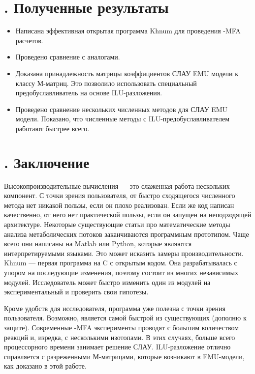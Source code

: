 \documentclass[14pt, a4paper]{extreport}
\newcommand{\CC}{C\nolinebreak\hspace{-.05em}\raisebox{.4ex}{\tiny\bf +}\nolinebreak\hspace{-.10em}\raisebox{.4ex}{\tiny\bf +}}
\def\CC{{C\nolinebreak[4]\hspace{-.05em}\raisebox{.4ex}{\tiny\bf ++}}} %
\begin{document}
\chapter[Полученные результаты]{\thechapter{}. Полученные результаты}
\begin{itemize}
	\item Написана эффективная открытая программа Khnum для проведения -MFA расчетов.
	\item Проведено сравнение с аналогами.
	\item Доказана принадлежность матрицы коэффициентов СЛАУ EMU модели к классу М-матриц. Это позволило использовать специальный предобуславливатель на основе ILU-разложения.
	\item Проведено сравнение нескольких численных методов для СЛАУ EMU модели. Показано, что численные методы с ILU-предобуславливателем работают быстрее всего.
\end{itemize}


\chapter[Заключение]{\thechapter{}. Заключение}
Высокопроизводительные вычисления --- это слаженная работа нескольких компонент. С точки зрения пользователя, от быстро сходящегося численного метода нет никакой пользы, если он плохо реализован. Если же код написан качественно, от него нет практической пользы, если он запущен на неподходящей архитектуре. Некоторые существующие статьи про математические методы анализа метаболических потоков заканчиваются программным прототипом\cite{adjoint_approach, bayesian_3, p13CMFA}. Чаще всего они написаны на Matlab или Python, которые являются интерпретируемыми языками. Это может исказить замеры производительности. Khnum --- первая программа на \CC{} с открытым кодом. Она разрабатывалась с упором на последующие изменения, поэтому состоит из многих независимых модулей. Исследователь может быстро изменить один из модулей на экспериментальный и проверить свои гипотезы. 

Кроме удобств для исследователя, программа уже полезна с точки зрения пользователя. Возможно, является самой быстрой из существующих (дополню к защите). Современные -MFA эксперименты проводят с большим количеством реакций и, изредка, с несколькими изотопами. В этих случаях, больше всего процессорного времени занимает решение СЛАУ. ILU-разложение отлично справляется с разреженными М-матрицами, которые возникают в EMU-модели, как доказано в этой работе.
 
\end{document}
